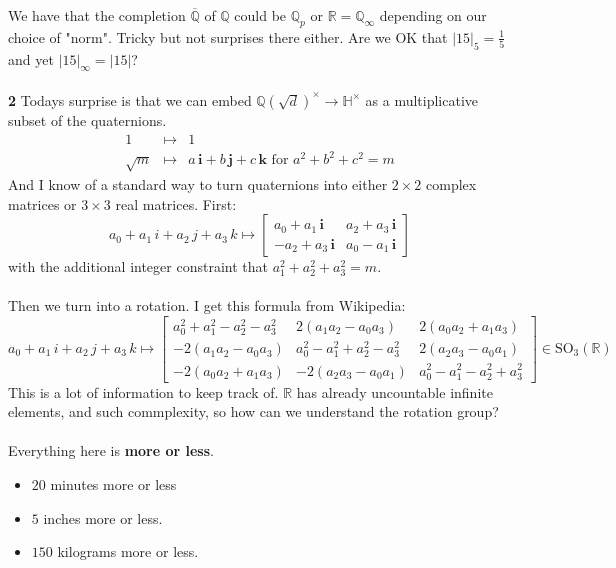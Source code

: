 \documentclass[12pt]{article}
\begin{document}
We have that the completion $\overline{\mathbb{Q}}$ of $\mathbb{Q}$ could be $\mathbb{Q}_p$ or $\mathbb{R} = \mathbb{Q}_\infty$  depending on our choice of "norm".  Tricky but not surprises there either. Are we OK that $|15|_5 = \frac{1}{5}$ and yet $|15|_\infty = |15|$? \\ \\
\textbf{2} Todays surprise is that we can embed $\mathbb{Q}(\sqrt{d})^\times \to \mathbb{H}^\times$ as a multiplicative subset of the quaternions. 
\begin{eqnarray*}
1 &\mapsto& 1 \\
\sqrt{m} &\mapsto& a \,\mathbf{i} + b \,\mathbf{j}+c\,\mathbf{k} \text{ for }a^2 + b^2 + c^2 = m
\end{eqnarray*}
And I know of a standard way to turn quaternions into either $2 \times 2$ complex matrices or $3 \times 3$ real matrices.  First:
$$ a_0 + a_1 \, i + a_2 \, j + a_3 \, k \mapsto \left[ 
\begin{array}{rr} a_0 + a_1 \, \textbf{i} & a_2 + a_3 \, \textbf{i} \\
- a_2 + a_3 \, \textbf{i} & a_0 - a_1 \, \textbf{i} \end{array}\right]$$
with the additional integer constraint that $a_1^2 + a_2^2 + a_3^2 = m$. \\ \\
Then we turn into a rotation. I get this formula from Wikipedia:
$$a_0 + a_1 \, i + a_2 \, j + a_3 \, k
\mapsto \left[ \begin{array}{cccc}
a_0^2 + a_1^2 - a_2^2 - a_3^2 & 2(a_1 a_2 - a_0 a_3) & 2(a_0 a_2 + a_1 a_3) \\
-2(a_1 a_2 - a_0 a_3) & a_0^2 - a_1^2 + a_2^2 - a_3^2 & 2(a_2 a_3 - a_0 a_1) \\
-2(a_0 a_2 + a_1 a_3) & -2(a_2 a_3 - a_0 a_1) & a_0^2 - a_1^2 - a_2^2 + a_3^2 \end{array} \right] \in \text{SO}_3(\mathbb{R}) $$
This is a lot of information to keep track of.  $\mathbb{R}$ has already uncountable infinite elements, and such commplexity, so how can we understand the rotation group? \\ \\
Everything here is \textbf{more or less}.  
\begin{itemize}
\item $20$ minutes more or less
\item $5$ inches more or less.  
\item $150$ kilograms more or less.
\end{itemize}
\end{document}
